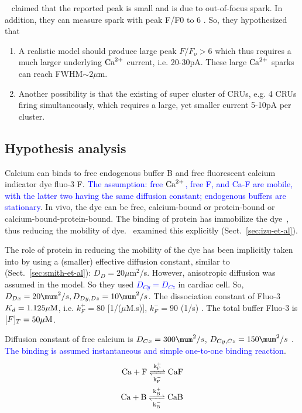 ~\citep{izu2001lcg} claimed that the reported peak is small and is due to
out-of-focus spark. In addition, they can measure spark with peak F/F0 to 6
\citep{wier2000}. So, they hypothesized that 
\begin{enumerate}
  \item A realistic model should produce large peak $F/F_o>6$ which thus  
  requires a much larger underlying ${\text{Ca}^{2+}}$ current, i.e. 20-30pA. These large
  ${\text{Ca}^{2+}}$ sparks can reach FWHM$\sim 2\mu$m. 
  \item  Another possibility is that the existing of super cluster of CRUs,
 e.g. 4 CRUs firing simultaneously, which requires a large, yet smaller current
 5-10pA per cluster.
\end{enumerate}


\subsection{Hypothesis analysis}
\label{sec:hypothesis-analysis-20}

Calcium can binds to free endogenous buffer B and free fluorescent calcium
indicator dye fluo-3 F. \textcolor{blue}{The assumption: free
  ${\text{Ca}^{2+}}$, free F, and Ca-F are mobile, with the latter two having the same
  diffusion constant; endogenous buffers are stationary}. In vivo, the dye can
  be free, calcium-bound or protein-bound or calcium-bound-protein-bound.  
The binding of protein has immobilize the
dye~\citep{blatter1990,harkins1993}, thus reducing the mobility of
dye.~\citep{izu1998} examined this explicitly
(Sect.~\ref{sec:izu-et-al}). 

The role of protein in reducing the mobility of the dye has been implicitly
taken into by using a (smaller) effective diffusion constant, similar to
~\citep{smith1998} (Sect.~\ref{sec:smith-et-al}): $D_D=20\mu$m$^2$/s.
However, anisotropic diffusion was assumed in the model. So they used
\textcolor{blue}{$D_{Cy}=D_{Cz}$} in cardiac cell. So, $D_{Dx}=20\mum^2/s,
D_{Dy,Dz}=10\mum^2/s$. The dissociation constant of Fluo-3 $K_d=1.125{\mu\text{M}}$,
i.e. $k^+_F=80$ [1/($\mu$M.s)], $k^-_F=90$ (1/s) \citep{smith1998}. The total
buffer Fluo-3 is $[F]_T=50{\mu\text{M}}$.


Diffusion constant of free calcium is $D_{Cx}=300\mum^2/s$,
$D_{Cy,Cz}=150\mum^2/s$ \citep{baylor1998}.  \textcolor{blue}{The binding is
assumed instantaneous and simple one-to-one binding reaction}.
\begin{equation}
  \label{eq:1429}
  \begin{split}
      \ce{Ca + F <=>[k^+_F][k^-_F] CaF} \\
      \ce{Ca + B <=>[k^+_B][k^-_B] CaB} \\      
  \end{split}
\end{equation}

